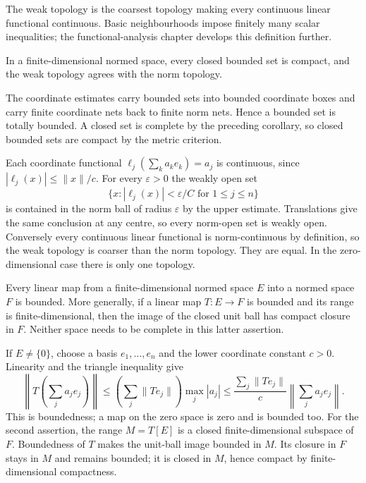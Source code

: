 The weak topology is the coarsest topology making every continuous
linear functional continuous. Basic neighbourhoods impose finitely many
scalar inequalities; the functional-analysis chapter develops this
definition further.

\begin{corollary}
In a finite-dimensional normed space, every closed bounded set is compact,
and the weak topology agrees with the norm topology.
\end{corollary}
\Proof
The coordinate estimates carry bounded sets into bounded coordinate boxes
and carry finite coordinate nets back to finite norm nets. Hence a bounded
set is totally bounded. A closed set is complete by the preceding
corollary, so closed bounded sets are compact by the metric criterion.

Each coordinate functional $\ell_j(\sum_k a_ke_k)=a_j$ is continuous,
since $|\ell_j(x)|\leq\|x\|/c$. For every $\varepsilon>0$ the weakly
open set
\[
\{x:|\ell_j(x)|<\varepsilon/C\text{ for }1\leq j\leq n\}
\]
is contained in the norm ball of radius $\varepsilon$ by the upper
estimate. Translations give the same conclusion at any centre, so every
norm-open set is weakly open. Conversely every continuous linear
functional is norm-continuous by definition, so the weak topology is
coarser than the norm topology. They are equal. In the zero-dimensional
case there is only one topology.
\Done

\begin{corollary}
Every linear map from a finite-dimensional normed space $E$ into a
normed space $F$ is bounded. More generally, if a linear map $T:E\to F$
is bounded and its range is finite-dimensional, then the image of the
closed unit ball has compact closure in $F$. Neither space needs to be
complete in this latter assertion.
\end{corollary}
\Proof
If $E\ne\{0\}$, choose a basis $e_1,\ldots,e_n$ and the lower
coordinate constant $c>0$. Linearity and the triangle inequality give
\[
\left\|T\left(\sum_j a_je_j\right)\right\|
\leq \left(\sum_j\|Te_j\|\right)\max_j|a_j|
\leq \frac{\sum_j\|Te_j\|}{c}\left\|\sum_j a_je_j\right\|.
\]
This is boundedness; a map on the zero space is zero and is bounded too.
For the second assertion, the range $M=T[E]$ is a closed
finite-dimensional subspace of $F$. Boundedness of $T$ makes the unit-ball
image bounded in $M$. Its closure in $F$ stays in $M$ and remains bounded;
it is closed in $M$, hence compact by finite-dimensional compactness.
\Done


